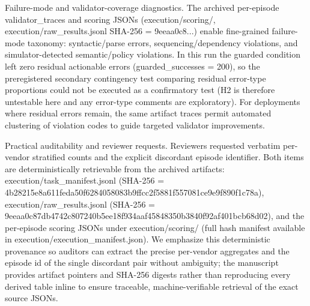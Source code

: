 \documentclass[conference]{IEEEtran}
\begin{document}
Failure-mode and validator-coverage diagnostics. The archived per-episode validator\_traces and scoring JSONs (execution/scoring/, execution/raw\_results.jsonl SHA-256 = 9eeaa0c8...) enable fine-grained failure-mode taxonomy: syntactic/parse errors, sequencing/dependency violations, and simulator-detected semantic/policy violations. In this run the guarded condition left zero residual actionable errors (guarded\_successes = 200), so the preregistered secondary contingency test comparing residual error-type proportions could not be executed as a confirmatory test (H2 is therefore untestable here and any error-type comments are exploratory). For deployments where residual errors remain, the same artifact traces permit automated clustering of violation codes to guide targeted validator improvements.

Practical auditability and reviewer requests. Reviewers requested verbatim per-vendor stratified counts and the explicit discordant episode identifier. Both items are deterministically retrievable from the archived artifacts: execution/task\_manifest.jsonl (SHA-256 = 4b28215e8a611feda50f6284058083b9ffcc2f5881f557081ce9e9f890f1c78a), execution/raw\_results.jsonl (SHA-256 = 9eeaa0c87db4742c807240b5ee18f934aaf45848350b3840f92af401bcb68d02), and the per-episode scoring JSONs under execution/scoring/ (full hash manifest available in execution/execution\_manifest.json). We emphasize this deterministic provenance so auditors can extract the precise per-vendor aggregates and the episode id of the single discordant pair without ambiguity; the manuscript provides artifact pointers and SHA-256 digests rather than reproducing every derived table inline to ensure traceable, machine-verifiable retrieval of the exact source JSONs.
\end{document}

